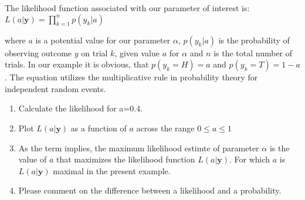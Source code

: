 \documentclass[12pt,english]{scrartcl}
\begin{document}
The likelihood function associated with our parameter of interest is:\\

$\displaystyle L(a|\textbf{y}) = \prod_{k=1}^n p(y_k|a)$

where $a$ is a potential value for our parameter $\alpha$, $p(y_k|a)$ is the probability of observing outcome $y$ on trial $k$, given value $a$ for $\alpha$ and $n$ is the total number of trials. In our example it is obvious, that $p(y_k=H) = a$ and $p(y_k=T)=1-a$. The equation utilizes the multiplicative rule in probability theory for independent random events. 

\begin{enumerate}
 \item Calculate the likelihood for a=0.4.
 \item Plot $L(a|\textbf{y})$ as a function of $a$ across the range $0\leq a \leq 1$
 \item As the term implies, the maximum likelihood estimte of parameter $\alpha$ is the value of $a$ that maximizes the likelihood function $L(a|\textbf{y})$. For which $a$ is $L(a|\textbf{y})$ maximal in the present example.
 \item Please comment on the difference between a likelihood and a probability.   
\end{enumerate}


  
\end{document}
